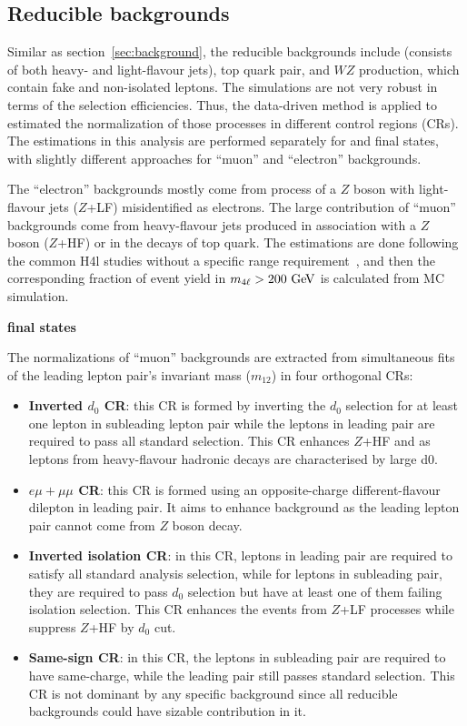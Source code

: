 \subsection{Reducible backgrounds}

Similar as section~\ref{sec:background}, the reducible backgrounds include \Zjet (consists of both heavy- and light-flavour jets), top quark pair, and $WZ$ production, which contain fake and non-isolated leptons.
The simulations are not very robust in terms of the selection efficiencies.
Thus, the data-driven method is applied to estimated the normalization of those processes in different control regions (CRs).
The estimations in this analysis are performed separately for \llmumu and \llee final states, with slightly different approaches for ``muon'' and ``electron'' backgrounds.

The ``electron'' backgrounds mostly come from process of a $Z$ boson with light-flavour jets ($Z$+LF) misidentified as electrons.
The large contribution of ``muon'' backgrounds come from heavy-flavour jets produced in association with a $Z$ boson ($Z$+HF) or in the decays of top quark.
The estimations are done following the common H4l studies without a specific \mfl range requirement~\cite{PhysRevD.91.012006}, and then the corresponding fraction of event yield in $m_{4\ell} > 200~\text{Ge\kern -0.1em V}$ is calculated from MC simulation.

\textbf{\llmumu final states} 

The normalizations of ``muon'' backgrounds are extracted from simultaneous fits of the leading lepton pair's invariant mass ($m_{12}$) in four orthogonal CRs:
\begin{itemize}
	\item \textbf{Inverted $d_{0}$ CR}: this CR is formed by inverting the $d_{0}$ selection for at least one lepton in subleading lepton pair while the leptons in leading pair are required to pass all standard selection.
This CR enhances $Z$+HF and \ttbar as leptons from heavy-flavour hadronic decays are characterised by large d0.
	\item \textbf{$e\mu+\mu\mu$ CR}: this CR is formed using an opposite-charge different-flavour dilepton in leading pair.
It aims to enhance \ttbar background as the leading lepton pair cannot come from $Z$ boson decay.
	\item \textbf{Inverted isolation CR}: in this CR, leptons in leading pair are required to satisfy all standard analysis selection, while for leptons in subleading pair, they are required to pass $d_{0}$ selection but have at least one of them failing isolation selection.
This CR enhances the events from $Z$+LF processes while suppress $Z$+HF by $d_{0}$ cut.
	\item \textbf{Same-sign CR}: in this CR, the leptons in subleading pair are required to have same-charge, while the leading pair still passes standard selection.
This CR is not dominant by any specific background since all reducible backgrounds could have sizable contribution in it.
\end{itemize}

